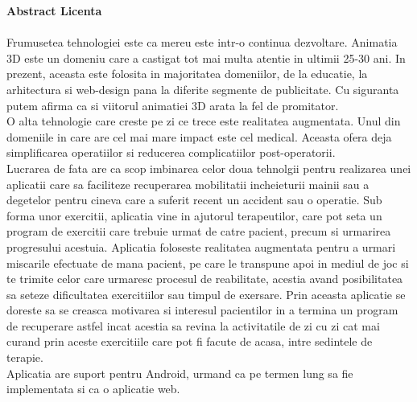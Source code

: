 \documentclass{article}
\newcommand\tab[1][1cm]{\hspace*{#1}}
\begin{document}
	\textbf{Abstract Licenta}\\\\
	\tab Frumusetea tehnologiei este ca mereu este intr-o continua dezvoltare. Animatia 3D este un domeniu care a castigat tot mai multa atentie in ultimii 25-30 ani. In prezent, aceasta este folosita in majoritatea domeniilor, de la educatie, la arhitectura si web-design pana la diferite segmente de publicitate. Cu siguranta putem afirma ca si viitorul animatiei 3D arata la fel de promitator.\\
	\tab O alta tehnologie care creste pe zi ce trece este realitatea augmentata. Unul din domeniile in care are cel mai mare impact este cel medical. Aceasta ofera deja simplificarea operatiilor si reducerea complicatiilor post-operatorii.\\
	\tab Lucrarea de fata are ca scop imbinarea celor doua tehnolgii pentru realizarea unei aplicatii care sa faciliteze recuperarea mobilitatii incheieturii mainii sau a degetelor pentru cineva care a suferit recent un accident sau o operatie. Sub forma unor exercitii, aplicatia vine in ajutorul terapeutilor, care pot seta un program de exercitii care trebuie urmat de catre pacient, precum si urmarirea progresului acestuia. Aplicatia foloseste realitatea augmentata pentru a urmari miscarile efectuate de mana pacient, pe care le transpune apoi in mediul de joc si te trimite celor care urmaresc procesul de reabilitate, acestia avand posibilitatea sa seteze dificultatea exercitiilor sau timpul de exersare. Prin aceasta aplicatie se doreste sa se creasca motivarea si interesul pacientilor in a termina un program de recuperare astfel incat acestia sa revina la activitatile de zi cu zi cat mai curand prin aceste exercitiile care pot fi facute de acasa, intre sedintele de terapie.\\
	\tab Aplicatia are suport pentru Android, urmand ca pe termen lung sa fie implementata si ca o aplicatie web.\\	
\end{document}
